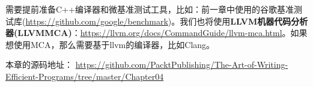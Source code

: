 需要提前准备C++编译器和微基准测试工具，比如：前一章中使用的谷歌基准测试库(\url{https://github.com/google/benchmark})。我们也将使用\textbf{LLVM机器代码分析器(LLVMMCA)}：\url{https://llvm.org/docs/CommandGuide/llvm-mca.html}。如果想使用MCA，那么需要基于llvm的编译器，比如Clang。

本章的源码地址： \url{https://github.com/PacktPublishing/The-Art-of-Writing-Efficient-Programs/tree/master/Chapter04}